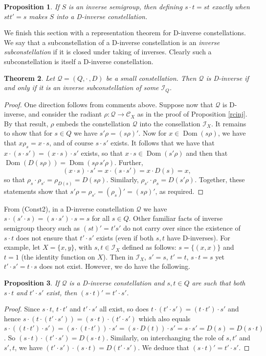 \documentclass[12pt]{amsart}
\newtheorem{thm}{Theorem}[section]
\newtheorem{pro}[thm]{Proposition}
\theoremstyle{definition}
\newcommand{\Q}{\mathcal Q}
\newcommand{\C}{\mathcal C}
\newcommand{\I}{\mathcal I}
\DeclareMathOperator{\Dom}{Dom}
\begin{document}
\begin{pro} \label{inv2inv}
If $S$ is an inverse semigroup, then defining $s\cdot t=st$ exactly when $stt'=s$ makes $S$ into a D-inverse constellation.
\end{pro}

We finish this section with a representation theorem for D-inverse constellations. We say that a subconstellation of a D-inverse constellation is an {\em inverse subconstellation} if it is closed under taking of inverses. Clearly such a subconstellation is itself a D-inverse constellation.


\begin{thm}  \label{normiso}  Let $\Q=(Q,\cdot\, ,D)$ be a small constellation. Then
$\Q$ is D-inverse if and only if it is an inverse subconstellation of some $\I_Q$.
\end{thm}
\begin{proof}  One direction follows from comments above. 
Suppose now that $\Q$ is D-inverse, and consider the radiant $\rho:\Q\rightarrow \C_X$ as in the proof of Proposition \ref{rcinj}.  By that result, $\rho$ embeds the constellation $\Q$ into the consellation $\I_X$.  It remains to show that for $s\in Q$
we have $s'\rho=(s\rho)'$.  Now for $x\in\Dom(s\rho)$, we have that $x\rho_s=x\cdot s$, and of course $s\cdot s'$ exists. It follows that we have that $x\cdot (s\cdot s')=(x\cdot s)\cdot s'$ exists, so that $x\cdot s\in\Dom(s'\rho)$ and then that 
$\Dom(D(s\rho))=\Dom (s\rho \, s'\rho)$. Further, 
\[(x\cdot s)\cdot s'=x\cdot (s\cdot s')=x\cdot D(s)=x,\]
so that  $\rho_s\cdot\rho_{s'}=\rho_{D(s)}=D(s\rho)$.  Similarly, $\rho_{s'}\cdot\rho_{s}=D({s'}\rho)$.  Together, these statements show that $s'\rho=\rho_{s'}=(\rho_s)'=(s\rho)'$, as required.
\end{proof}

From (Const2), in a D-inverse constellation $\Q$ we have  $s\cdot (s'\cdot s)=(s\cdot s')\cdot s=s$ for all $s\in Q$.  Other familiar facts of inverse semigroup theory such as $(st)'=t's'$ do not carry over since the existence of $s\cdot t$ does not ensure that $t'\cdot s'$ exists (even if both $s,t$ have D-inverses).  For example, let $X=\{x,y\}$, with $s,t\in \I_X$ defined as follows: $s=\{(x,x)\}$ and $t=1$ (the identity function on $X$).  Then in $\I_X$, $s'=s$, $t'=t$, $s\cdot t=s$ yet $t'\cdot s'=t\cdot s$ does not exist.  However, we do have the following.

\begin{pro}  \label{sands}
If $\Q$ is a D-inverse constellation and $s,t\in Q$ are such that both $s\cdot t$ and $t'\cdot s'$ exist, then $(s\cdot t)'=t'\cdot s'$.
\end{pro}
\begin{proof}
Since $s\cdot t$, $t\cdot t'$ and $t'\cdot s'$ all exist, so does $t\cdot (t'\cdot s')=(t\cdot t')\cdot s'$ and hence $s\cdot (t\cdot (t'\cdot s'))=(s\cdot t)\cdot (t'\cdot s')$ which also equals $s\cdot((t\cdot t')\cdot s')=(s\cdot(t\cdot t'))\cdot s'=(s\cdot D(t))\cdot s'=s\cdot s'=D(s)=D(s\cdot t)$.  So $(s\cdot t)\cdot (t'\cdot s')=D(s\cdot t)$.  Similarly, on interchanging the role of $s,t'$ and $s',t$, we have $(t'\cdot s')\cdot (s\cdot t)=D(t'\cdot s')$.  We deduce that $(s\cdot t)'=t'\cdot s'$.
\end{proof}
\end{document}
